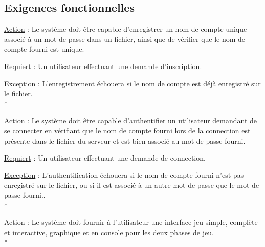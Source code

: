 \documentclass[a4paper]{article}
\begin{document}
\subsection{Exigences fonctionnelles}
\begin{description}[style=nextline]
\item[Enregistrer :]
\begin{description}[leftmargin=*] %
\item \underline{Action} : Le système doit être capable d'enregistrer un nom de compte unique associé à un mot de passe dans un fichier, ainsi que de vérifier que le nom de compte fourni est unique.
\item \underline{Requiert} : Un utilisateur effectuant une demande d'inscription.
\item \underline{Exception} : L'enregistrement échouera si le nom de compte est déjà enregistré sur le fichier.\\*
\end{description} %

\item[Authentifier :]
\begin{description}[leftmargin=*] %
\item \underline{Action} : Le système doit être capable d'authentifier un utilisateur demandant de se connecter en vérifiant que le nom de compte fourni lors de la connection est présente dans le fichier du serveur et est bien associé au mot de passe fourni.
\item \underline{Requiert} : Un utilisateur effectuant une demande de connection.
\item \underline{Exception} : L'authentification échouera si le nom de compte fourni n'est pas enregistré sur le fichier, ou si il est associé à un autre mot de passe que le mot de passe fourni..\\*
\end{description} %

\item[Fournir une interface :]
\begin{description}[leftmargin=*] %
\item \underline{Action} : Le système doit fournir à l'utilisateur une interface jeu simple, complète et interactive, graphique et en console pour les deux phases de jeu.\\*
\end{description} %


\end{description}
\end{document}
